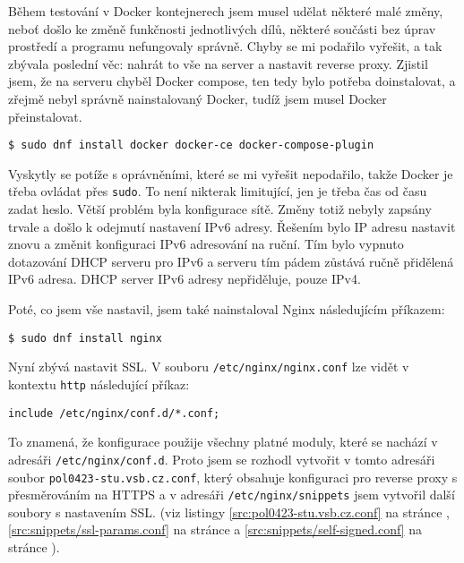 Během testování v Docker kontejnerech jsem musel udělat některé malé
změny, neboť došlo ke změně funkčnosti jednotlivých dílů, některé součásti
bez úprav prostředí a programu nefungovaly správně. Chyby se mi podařilo
vyřešit, a tak zbývala poslední věc: nahrát to vše na server a nastavit
reverse proxy. Zjistil jsem, že na serveru chyběl Docker compose,
ten tedy bylo potřeba doinstalovat, a zřejmě nebyl správně nainstalovaný
Docker, tudíž jsem musel Docker přeinstalovat.

\begin{verbatim}
$ sudo dnf install docker docker-ce docker-compose-plugin
\end{verbatim}

Vyskytly se potíže s oprávněními, které se mi vyřešit nepodařilo,
takže Docker je třeba ovládat přes \texttt{sudo}. To není nikterak
limitující, jen je třeba čas od času zadat heslo. Větší problém byla
konfigurace sítě. Změny totiž nebyly zapsány trvale a došlo k odejmutí
nastavení IPv6 adresy. Řešením bylo IP adresu nastavit znovu a změnit
konfiguraci IPv6 adresování na ruční. Tím bylo vypnuto dotazování DHCP
serveru pro IPv6 a serveru tím pádem zůstává ručně přidělená IPv6 adresa.
DHCP server IPv6 adresy nepřiděluje, pouze IPv4.

Poté, co jsem vše nastavil, jsem také nainstaloval Nginx následujícím
příkazem:

\begin{verbatim}
$ sudo dnf install nginx
\end{verbatim}

Nyní zbývá nastavit SSL. V souboru \texttt{/etc/nginx/nginx.conf}
lze vidět v kontextu \texttt{http} následující příkaz:

\begin{verbatim}
include /etc/nginx/conf.d/*.conf;
\end{verbatim}

To znamená, že konfigurace použije všechny platné moduly, které se nachází
v adresáři \texttt{/etc/nginx/conf.d}. Proto jsem se rozhodl vytvořit
v tomto adresáři soubor \texttt{pol0423-stu.vsb.cz.conf}, který obsahuje
konfiguraci pro reverse proxy s přesměrováním na HTTPS
a v adresáři \texttt{/etc/nginx/snippets} jsem vytvořil další
soubory s nastavením SSL. (viz listingy \ref{src:pol0423-stu.vsb.cz.conf}
na stránce \pageref{src:pol0423-stu.vsb.cz.conf},
\ref{src:snippets/ssl-params.conf} na stránce
\pageref{src:snippets/ssl-params.conf} a \ref{src:snippets/self-signed.conf}
na stránce \pageref{src:snippets/self-signed.conf}).

